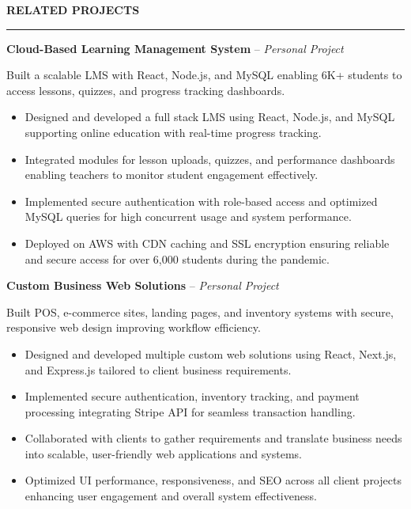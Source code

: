 \documentclass[10pt,letterpaper]{article}
\begin{document}
\vspace{6pt}

\textbf{RELATED PROJECTS}\\[-8pt]
\noindent\rule{\textwidth}{1pt}

\vspace{-2pt}

\textbf{Cloud-Based Learning Management System} -- \emph{Personal Project}

\vspace{-1pt}

Built a scalable LMS with React, Node.js, and MySQL enabling 6K+ students to access lessons, quizzes, and progress tracking dashboards.
\vspace{-1pt}
\begin{itemize}
\item Designed and developed a full stack LMS using React, Node.js, and MySQL supporting online education with real-time progress tracking.
\item Integrated modules for lesson uploads, quizzes, and performance dashboards enabling teachers to monitor student engagement effectively.
\item Implemented secure authentication with role-based access and optimized MySQL queries for high concurrent usage and system performance.
\item Deployed on AWS with CDN caching and SSL encryption ensuring reliable and secure access for over 6,000 students during the pandemic.
\end{itemize}

\textbf{Custom Business Web Solutions} -- \emph{Personal Project}

\vspace{-1pt}

Built POS, e-commerce sites, landing pages, and inventory systems with secure, responsive web design improving workflow efficiency.
\vspace{-1pt}
\begin{itemize}
\item Designed and developed multiple custom web solutions using React, Next.js, and Express.js tailored to client business requirements.
\item Implemented secure authentication, inventory tracking, and payment processing integrating Stripe API for seamless transaction handling.
\item Collaborated with clients to gather requirements and translate business needs into scalable, user-friendly web applications and systems.
\item Optimized UI performance, responsiveness, and SEO across all client projects enhancing user engagement and overall system effectiveness.
\end{itemize}
\end{document}

